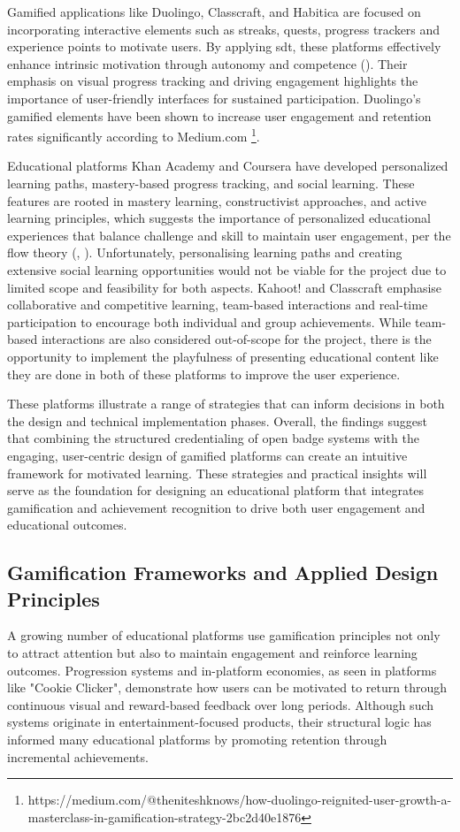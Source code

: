 Gamified applications like Duolingo, Classcraft, and Habitica are focused on incorporating interactive elements such as streaks, quests, progress trackers and experience points to motivate users. 
By applying \acrshort{sdt}, these platforms effectively enhance intrinsic motivation through autonomy and competence (\cite{sdt}). 
Their emphasis on visual progress tracking and driving engagement highlights the importance of user-friendly interfaces for sustained participation. 
Duolingo’s gamified elements have been shown to increase user engagement and retention rates significantly according to Medium.com \footnote{https://medium.com/@theniteshknows/how-duolingo-reignited-user-growth-a-masterclass-in-gamification-strategy-2bc2d40e1876}.

Educational platforms Khan Academy and Coursera have developed personalized learning paths, mastery-based progress tracking, and social learning. 
These features are rooted in mastery learning, constructivist approaches, and active learning principles, which suggests the importance of personalized educational experiences that balance challenge and skill to maintain user engagement, per the flow theory (\cite{flow}, \cite{powerFeedback}). 
Unfortunately, personalising learning paths and creating extensive social learning opportunities would not be viable for the project due to limited scope and feasibility for both aspects. 
Kahoot! and Classcraft emphasise collaborative and competitive learning, team-based interactions and real-time participation to encourage both individual and group achievements. 
While team-based interactions are also considered out-of-scope for the project, there is the opportunity to implement the playfulness of presenting educational content like they are done in both of these platforms to improve the user experience.

These platforms illustrate a range of strategies that can inform decisions in both the design and technical implementation phases. 
Overall, the findings suggest that combining the structured credentialing of open badge systems with the engaging, user-centric design of gamified platforms can create an intuitive framework for motivated learning. 
These strategies and practical insights will serve as the foundation for designing an educational platform that integrates gamification and achievement recognition to drive both user engagement and educational outcomes.

\subsection{Gamification Frameworks and Applied Design Principles}
A growing number of educational platforms use gamification principles not only to attract attention but also to maintain engagement and reinforce learning outcomes. 
Progression systems and in-platform economies, as seen in platforms like "Cookie Clicker", demonstrate how users can be motivated to return through continuous visual and reward-based feedback over long periods. 
Although such systems originate in entertainment-focused products, their structural logic has informed many educational platforms by promoting retention through incremental achievements.

